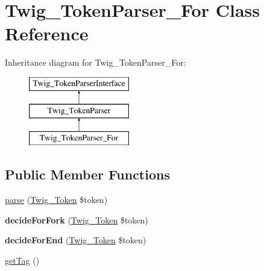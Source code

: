 \hypertarget{classTwig__TokenParser__For}{}\section{Twig\+\_\+\+Token\+Parser\+\_\+\+For Class Reference}
\label{classTwig__TokenParser__For}
Inheritance diagram for Twig\+\_\+\+Token\+Parser\+\_\+\+For\+:\begin{figure}[H]
\begin{center}
\leavevmode
\includegraphics[height=3.000000cm]{classTwig__TokenParser__For}
\end{center}
\end{figure}
\subsection*{Public Member Functions}
\begin{DoxyCompactItemize}
\item 
\hyperlink{classTwig__TokenParser__For_a609220e89af9c7bfb9e46cdfacb7bf8d}{parse} (\hyperlink{classTwig__Token}{Twig\+\_\+\+Token} \$token)
\item 
{\bfseries decide\+For\+Fork} (\hyperlink{classTwig__Token}{Twig\+\_\+\+Token} \$token)\hypertarget{classTwig__TokenParser__For_aa6239f0e96b2355d43faa3fb3abe3457}{}\label{classTwig__TokenParser__For_aa6239f0e96b2355d43faa3fb3abe3457}

\item 
{\bfseries decide\+For\+End} (\hyperlink{classTwig__Token}{Twig\+\_\+\+Token} \$token)\hypertarget{classTwig__TokenParser__For_ad8a01f6f47ef54aa1eef85d4a8f256d9}{}\label{classTwig__TokenParser__For_ad8a01f6f47ef54aa1eef85d4a8f256d9}

\item 
\hyperlink{classTwig__TokenParser__For_a187bcfbdf17324298cd324309fbc5741}{get\+Tag} ()
\end{DoxyCompactItemize}
